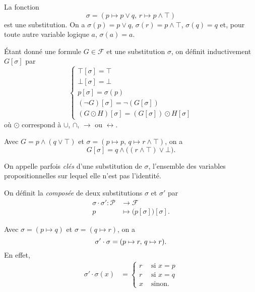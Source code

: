 \begin{exm}
	La fonction \[
		\sigma = (p \mapsto p \lor q,\,r \mapsto p \land \top)
	\] est une substitution. On a $\sigma(p) = p \lor q$, $\sigma(r) = p \land \top$, $\sigma(q) = q$\/ et, pour toute autre variable logique $a$, $\sigma(a) = a$.
\end{exm}

\begin{defn}
	Étant donné une formule $G \in \mathcal{F}$\/ et une substitution $\sigma$, on définit inductivement $G[\sigma]$\/ par \[
		\begin{cases}
			\top[\sigma] = \top\\
			\bot[\sigma] = \bot\\
			p[\sigma] = \sigma(p)\\
			(\lnot G)[\sigma] = \lnot (G[\sigma])\\
			(G \odot H)[\sigma] = (G[\sigma])\odot H[\sigma]
		\end{cases}
	\]
	où $\odot$\/ correspond à $\cup$, $\cap$, $\to$ ou $\leftrightarrow$.
\end{defn}

\begin{exm}
	Avec $G = p \land (q \lor \top)$\/ et $\sigma = (p \mapsto p,\,q\mapsto r \land \top)$, on a \[
		G[\sigma] = q \land \big((r \land \top) \lor \bot\big)
	.\]
\end{exm}

\begin{defn}
	On appelle parfois {\it clés}\/ d'une substitution de $\sigma$, l'ensemble des variables propositionnelles sur lequel elle n'est pas l'identité.
\end{defn}

\begin{defn}
	On définit la {\it composée}\/ de deux substitutions $\sigma$\/ et $\sigma'$\/ par 
	\begin{align*}
		\sigma \cdot  \sigma': \mathcal{P} &\longrightarrow \mathcal{F} \\
		p &\longmapsto \big(p[\sigma]\big)[\sigma].
	\end{align*}
\end{defn}

\begin{exm}
	Avec $\sigma = (p \mapsto q)$\/ et $\sigma = (q \mapsto r)$, on a \[
		\sigma' \cdot \sigma = (p \mapsto r,\,q\mapsto r)\\
	.\] En effet,
	\begin{align*}
		\sigma' \cdot \sigma(x) &= \begin{cases}
			r &\text{ si } x = p\\
			r &\text{ si } x= q\\
			x &\text{ sinon}.
		\end{cases} \\
	\end{align*}
\end{exm}

